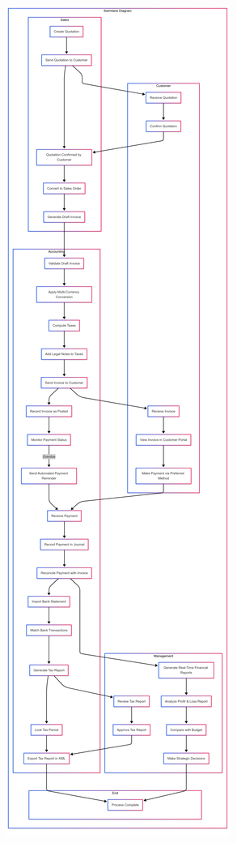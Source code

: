 \documentclass[11pt,a4paper]{article}
\begin{document}
\begin{minipage}{0.45\textwidth}
    \centering
    \includegraphics[width=\linewidth, height=0.8\textheight, keepaspectratio]{diagram/Swimlane.png}
\end{minipage}%
\end{document}
